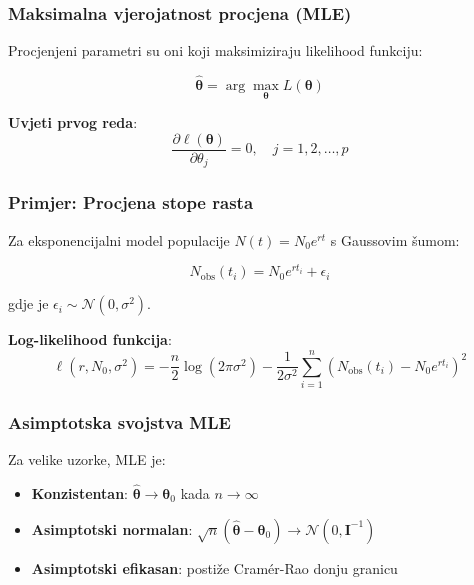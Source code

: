 \documentclass[11pt,oneside]{book}
\begin{document}
\subsubsection{Maksimalna vjerojatnost procjena (MLE)}

Procjenjeni parametri su oni koji maksimiziraju likelihood funkciju:

\begin{equation}
	\hat{\boldsymbol{\theta}} = \arg\max_{\boldsymbol{\theta}} L(\boldsymbol{\theta})
\end{equation}

\textbf{Uvjeti prvog reda}:
\begin{equation}
	\frac{\partial \ell(\boldsymbol{\theta})}{\partial \theta_j} = 0, \quad j = 1, 2, \ldots, p
\end{equation}

\subsubsection{Primjer: Procjena stope rasta}

Za eksponencijalni model populacije $N(t) = N_0 e^{rt}$ s Gaussovim šumom:

\begin{equation}
	N_{\text{obs}}(t_i) = N_0 e^{rt_i} + \epsilon_i
\end{equation}

gdje je $\epsilon_i \sim \mathcal{N}(0, \sigma^2)$.

\textbf{Log-likelihood funkcija}:
\begin{equation}
	\ell(r, N_0, \sigma^2) = -\frac{n}{2}\log(2\pi\sigma^2) - \frac{1}{2\sigma^2}\sum_{i=1}^n (N_{\text{obs}}(t_i) - N_0 e^{rt_i})^2
\end{equation}

\subsubsection{Asimptotska svojstva MLE}

Za velike uzorke, MLE je:
\begin{itemize}
	\item \textbf{Konzistentan}: $\hat{\boldsymbol{\theta}} \to \boldsymbol{\theta}_0$ kada $n \to \infty$
	\item \textbf{Asimptotski normalan}: $\sqrt{n}(\hat{\boldsymbol{\theta}} - \boldsymbol{\theta}_0) \to \mathcal{N}(0, \mathbf{I}^{-1})$
	\item \textbf{Asimptotski efikasan}: postiže Cramér-Rao donju granicu
\end{itemize}
\end{document}
